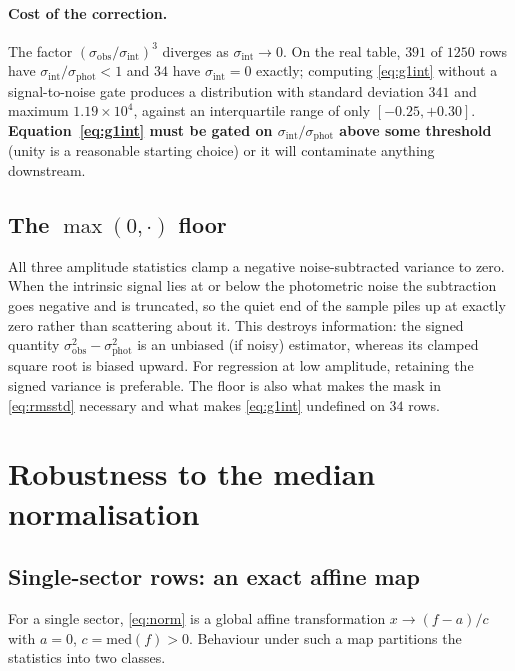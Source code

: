 \documentclass[11pt]{article}
\newcommand{\sigobs}{\sigma_{\mathrm{obs}}}
\newcommand{\sigphot}{\sigma_{\mathrm{phot}}}
\newcommand{\sigint}{\sigma_{\mathrm{int}}}
\begin{document}
\paragraph{Cost of the correction.} The factor $(\sigobs/\sigint)^3$ diverges as
$\sigint \to 0$. On the real table, $391$ of $1250$ rows have
$\sigint/\sigphot < 1$ and $34$ have $\sigint = 0$ exactly; computing
\eqref{eq:g1int} without a signal-to-noise gate produces a distribution with
standard deviation $341$ and maximum $1.19\times10^{4}$, against an interquartile
range of only $[-0.25, +0.30]$. \textbf{Equation~\eqref{eq:g1int} must be gated on
$\sigint/\sigphot$ above some threshold} (unity is a reasonable starting choice)
or it will contaminate anything downstream.

\subsection{The $\max(0,\cdot)$ floor}
\label{sec:floor}

All three amplitude statistics clamp a negative noise-subtracted variance to
zero. When the intrinsic signal lies at or below the photometric noise the
subtraction goes negative and is truncated, so the quiet end of the sample piles
up at exactly zero rather than scattering about it. This destroys information: the
signed quantity $\sigobs^2 - \sigphot^2$ is an unbiased (if noisy) estimator,
whereas its clamped square root is biased upward. For regression at low
amplitude, retaining the signed variance is preferable. The floor is also what
makes the mask in \eqref{eq:rmsstd} necessary and what makes \eqref{eq:g1int}
undefined on $34$ rows.

\section{Robustness to the median normalisation}

\subsection{Single-sector rows: an exact affine map}

For a single sector, \eqref{eq:norm} is a global affine transformation
$x \to (f - a)/c$ with $a = 0$, $c = \mathrm{med}(f) > 0$. Behaviour under such a
map partitions the statistics into two classes.
\end{document}
